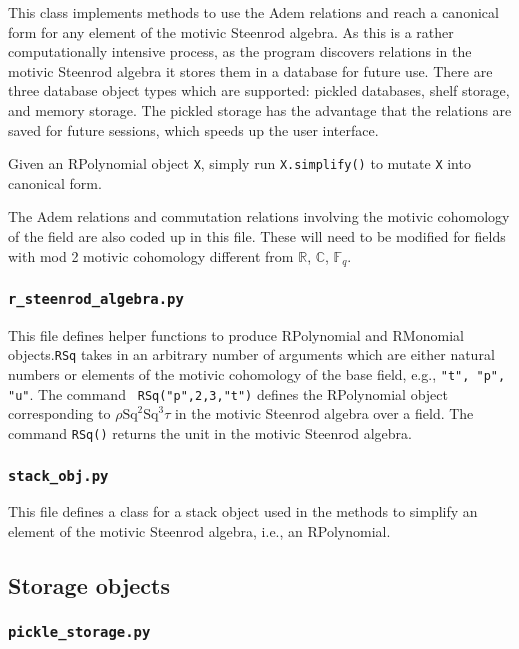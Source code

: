 \documentclass{article}
\newcommand{\Sq}{\mathrm{Sq}}
\begin{document}
This class implements methods to use the Adem relations and reach a
canonical form for any element of the motivic Steenrod algebra. As
this is a rather computationally intensive process, as the program
discovers relations in the motivic Steenrod algebra it stores them in
a database for future use. There are three database object types which
are supported: pickled databases, shelf storage, and memory
storage. The pickled storage has the advantage that the relations are
saved for future sessions, which speeds up the user interface. 

Given an RPolynomial object {\tt X}, simply run {\tt X.simplify()} to
mutate {\tt X} into canonical form.

The Adem relations and commutation relations involving the motivic
cohomology of the field are also coded up in this file. These will
need to be modified for fields with mod 2 motivic cohomology different
from $\mathbb{R}$, $\mathbb{C}$, $\mathbb{F}_q$.

\subsubsection{ {\tt r\_steenrod\_algebra.py}}

This file defines helper functions to produce RPolynomial and
RMonomial objects.{\tt RSq} takes in an arbitrary number of arguments
which are either natural numbers or elements of the motivic cohomology
of the base field, e.g., {\tt "t", "p", "u"}. The command {\tt
  RSq("p",2,3,"t")} defines the RPolynomial object corresponding to
$\rho \Sq^2\Sq^3\tau$ in the motivic Steenrod algebra over a field.
The command {\tt RSq()} returns the unit in the motivic Steenrod
algebra.

\subsubsection{ {\tt stack\_obj.py}}

This file defines a class for a stack object used in the methods to
simplify an element of the motivic Steenrod algebra, i.e., an
RPolynomial. 

\subsection{Storage objects}

\subsubsection{ {\tt pickle\_storage.py}}
\end{document}
